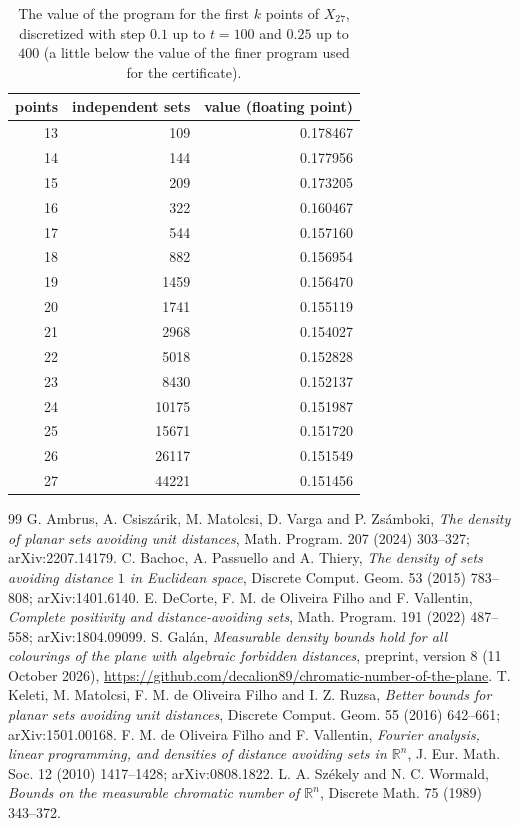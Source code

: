 \documentclass[11pt,a4paper]{amsart}
\theoremstyle{remark}
\newcommand{\R}{\mathbb{R}}
\begin{document}
\begin{table}[ht]
\centering
\small
\begin{tabular}{rrr}
\toprule
points & independent sets & value (floating point)\\
\midrule
13 & 109 & 0.178467\\
14 & 144 & 0.177956\\
15 & 209 & 0.173205\\
16 & 322 & 0.160467\\
17 & 544 & 0.157160\\
18 & 882 & 0.156954\\
19 & 1459 & 0.156470\\
20 & 1741 & 0.155119\\
21 & 2968 & 0.154027\\
22 & 5018 & 0.152828\\
23 & 8430 & 0.152137\\
24 & 10175 & 0.151987\\
25 & 15671 & 0.151720\\
26 & 26117 & 0.151549\\
27 & 44221 & 0.151456\\
\bottomrule
\end{tabular}
\caption{The value of the program for the first $k$ points of $X_{27}$, discretized with step $0.1$ up to $t=100$ and $0.25$ up to $400$ (a little below the value of the finer program used for the certificate).}\label{tab:values}
\end{table}

\begin{thebibliography}{99}
 G. Ambrus, A. Csisz\'arik, M. Matolcsi, D. Varga and P. Zs\'amboki, \emph{The density of planar sets
avoiding unit distances}, Math. Program. 207 (2024) 303--327; arXiv:2207.14179.
 C. Bachoc, A. Passuello and A. Thiery, \emph{The density of sets avoiding distance $1$ in Euclidean space},
Discrete Comput. Geom. 53 (2015) 783--808; arXiv:1401.6140.
 E. DeCorte, F. M. de Oliveira Filho and F. Vallentin, \emph{Complete positivity and distance-avoiding
sets}, Math. Program. 191 (2022) 487--558; arXiv:1804.09099.
 S. Gal\'an, \emph{Measurable density bounds hold for all colourings of the plane with algebraic
forbidden distances}, preprint, version 8 (11 October 2026),
\url{https://github.com/decalion89/chromatic-number-of-the-plane}.
 T. Keleti, M. Matolcsi, F. M. de Oliveira Filho and I. Z. Ruzsa, \emph{Better bounds for planar sets
avoiding unit distances}, Discrete Comput. Geom. 55 (2016) 642--661; arXiv:1501.00168.
 F. M. de Oliveira Filho and F. Vallentin, \emph{Fourier analysis, linear programming, and densities of
distance avoiding sets in $\R^n$}, J. Eur. Math. Soc. 12 (2010) 1417--1428; arXiv:0808.1822.
 L. A. Sz\'ekely and N. C. Wormald, \emph{Bounds on the measurable chromatic number of $\R^n$}, Discrete
Math. 75 (1989) 343--372.
\end{thebibliography}
\end{document}
